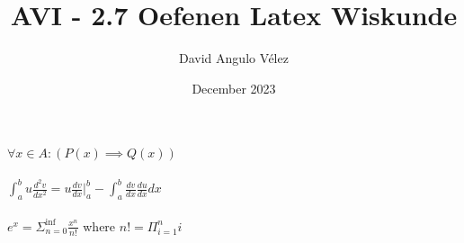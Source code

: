 \documentclass{article}
\title{AVI - 2.7 Oefenen Latex Wiskunde}
\author{David Angulo Vélez}
\date{December 2023}
\begin{document}
\maketitle
\noindent
$\forall x \in A : (P(x) \implies Q(x))$\\
\\
$\int ^{b}_{a} u \frac{d^2v}{dx^2} = u\frac{dv}{dx}\Big|^{b}_{a} - \int ^{b}_{a}\frac{dv}{dx}\frac{du}{dx}dx$\\
\\
$e^x = \Sigma^{\inf}_{n=0} \frac{x^n}{n!}$ where $n! = \Pi^{n}_{i=1}i$\\
\end{document}
